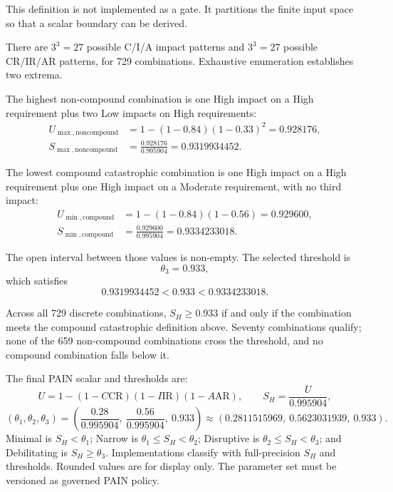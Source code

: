 \documentclass[11pt]{article}
\begin{document}
This definition is not implemented as a gate. It partitions the finite input space
so that a scalar boundary can be derived.

There are $3^3=27$ possible C/I/A impact patterns and $3^3=27$ possible
CR/IR/AR patterns, for 729 combinations. Exhaustive enumeration establishes two
extrema.

The highest non-compound combination is one High impact on a High requirement plus
two Low impacts on High requirements:
\begin{align}
U_{\max,\mathrm{noncompound}}
  &=1-(1-0.84)(1-0.33)^2=0.928176,\\
S_{\max,\mathrm{noncompound}}
  &=\frac{0.928176}{0.995904}=0.9319934452.
\end{align}

The lowest compound catastrophic combination is one High impact on a High
requirement plus one High impact on a Moderate requirement, with no third impact:
\begin{align}
U_{\min,\mathrm{compound}}
  &=1-(1-0.84)(1-0.56)=0.929600,\\
S_{\min,\mathrm{compound}}
  &=\frac{0.929600}{0.995904}=0.9334233018.
\end{align}

The open interval between those values is non-empty. The selected threshold is
\begin{equation}
\boxed{\theta_3=0.933},
\label{eq:theta3}
\end{equation}
which satisfies
\[
0.9319934452 < 0.933 < 0.9334233018.
\]

Across all 729 discrete combinations, $S_H\ge0.933$ if and only if the combination
meets the compound catastrophic definition above. Seventy combinations qualify;
none of the 659 non-compound combinations cross the threshold, and no compound
combination falls below it.

\begin{decisionbox}
The final PAIN scalar and thresholds are:
\[
U=1-(1-C\mathrm{CR})(1-I\mathrm{IR})(1-A\mathrm{AR}),
\qquad
S_H=\frac{U}{0.995904},
\]
\[
(\theta_1,\theta_2,\theta_3)=
\left(\frac{0.28}{0.995904},\ \frac{0.56}{0.995904},\ 0.933\right)
\approx(0.2811515969,\ 0.5623031939,\ 0.933).
\]
Minimal is $S_H<\theta_1$; Narrow is $\theta_1\le S_H<\theta_2$;
Disruptive is $\theta_2\le S_H<\theta_3$; and Debilitating is
$S_H\ge\theta_3$. Implementations classify with full-precision $S_H$ and
thresholds. Rounded values are for display only. The parameter set must be versioned
as governed PAIN policy.
\end{decisionbox}
\end{document}
